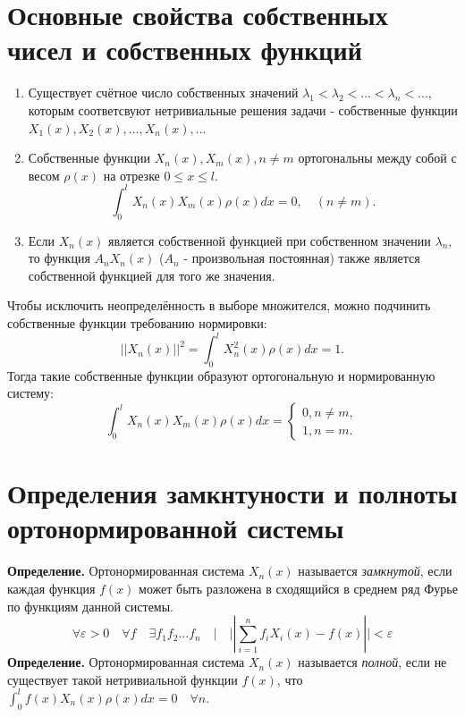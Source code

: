 \documentclass[12pt, a4paper]{report}
\begin{document}
\section{Основные свойства собственных чисел и собственных функций}
\begin{enumerate}
	\item Существует счётное число собственных значений $\lambda_1 < \lambda_2 < ... < \lambda_n < ... $, которым соответсвуют нетривиальные решения задачи - собственные функции $X_1 (x), X_2 (x), ..., X_n (x), ... $
	\item Собственные функции $X_n (x), X_m (x), n \neq m$ ортогональны между собой с весом $\rho (x)$ на отрезке $0 \leq x \leq l$.
\[ \int_{0}^{l} X_{n} (x) X_{m} (x) \rho (x) dx = 0, \quad (n \neq m). \]
	\item Если $X_n (x)$ является собственной функцией при собственном значении $\lambda_n$, то функция $A_n X_n (x)$ ($A_n$ - произвольная постоянная) также является собственной функцией для того же значения.
\end{enumerate}

Чтобы исключить неопределённость в выборе множителся, можно подчинить собственные функции требованию нормировки:
\[ ||X_n (x) ||^2 = \int_{0}^{l}  X^2_n (x) \rho (x) dx = 1. \] 
Тогда такие собственные функции образуют ортогональную и нормированную систему:
\begin{equation*}
	 \int_{0}^{l}  X_{n} (x) X_{m} (x) \rho (x) dx =  \begin{cases}
	0, n \neq m, \\
	1, n = m.
	\end{cases}
\end{equation*}

\section{Определения замкнтуности и полноты ортонормированной системы}
\textbf{Определение.} Ортонормированная система ${X_n (x)}$  называется \textit{замкнутой}, если каждая функция $f(x)$ может быть разложена в сходящийся в среднем ряд Фурье по функциям данной системы.
\[ \forall \varepsilon > 0 \quad \forall f \quad \exists f_1 f_2 ... f_n \quad | \quad ||\sum_{i = 1}^n f_i X_i (x) - f(x) || < \varepsilon  \]
\textbf{Определение.} Ортонормированная система ${X_n (x)}$  называется \textit{полной}, если не существует такой нетривиальной функции $f(x)$, что $\int_{0}^{l} f(x) X_n (x) \rho (x) dx = 0 \quad \forall n$.
\end{document}
